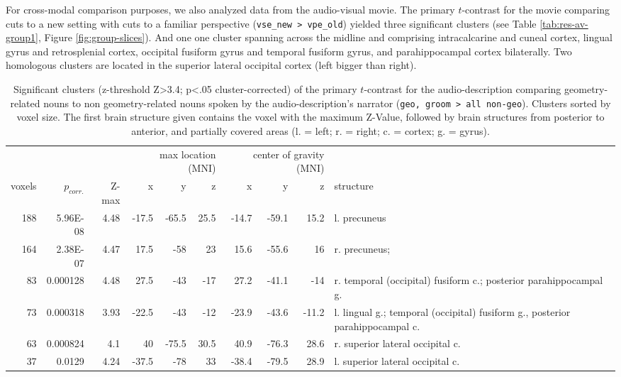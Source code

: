 \documentclass[english]{article}
\begin{document}
For cross-modal comparison purposes, we also analyzed data from the audio-visual
movie.
The primary $t$-contrast for the movie comparing cuts to a new setting with cuts
to a familiar perspective (\texttt{vse\_new > vpe\_old}) yielded three
significant clusters (see Table \ref{tab:res-av-group1}, Figure
\ref{fig:group-slices}).
And one one cluster spanning across the midline and comprising intracalcarine
and cuneal cortex, lingual gyrus and retrosplenial cortex, occipital fusiform
gyrus and temporal fusiform gyrus, and parahippocampal cortex bilaterally.
Two homologous clusters are located in the superior lateral occipital cortex
(left bigger than right).


\begin{table}[t]
    \caption{Significant clusters (z-threshold Z>3.4; p<.05 cluster-corrected)
        of the primary $t$-contrast for the audio-description comparing
        geometry-related nouns to non geometry-related nouns spoken by the
        audio-description's narrator (\texttt{geo, groom > all non-geo}).
        Clusters sorted by voxel size.
    The first brain structure given contains the voxel with the maximum Z-Value,
followed by brain structures from posterior to anterior, and partially covered
areas (l. = left; r. = right; c. = cortex; g. = gyrus).}
    \label{tab:res-ao-group1}
\begin{tabular}{rrrrrrrrrp{3cm}}
\toprule
& & & \multicolumn{3}{r}{max location (MNI)} & \multicolumn{3}{r}{center of gravity (MNI)} &
\\ \cmidrule{4-6} \cmidrule{7-9}
voxels & $p_{corr.}$ & Z-max & x & y & z  & x & y & z & structure \\
\midrule
188 & 5.96E-08 & 4.48 & -17.5 & -65.5 & 25.5 & -14.7 & -59.1 & 15.2 & l. precuneus \\
164 & 2.38E-07 & 4.47 & 17.5 & -58 & 23 & 15.6 & -55.6 & 16 & r. precuneus; \\
83 & 0.000128 & 4.48 & 27.5 & -43 & -17 & 27.2 & -41.1 & -14 & r. temporal (occipital) fusiform c.; posterior parahippocampal g. \\
73 & 0.000318 & 3.93 & -22.5 & -43 & -12 & -23.9 & -43.6 & -11.2 & l. lingual g.; temporal (occipital) fusiform g., posterior parahippocampal c. \\
63 & 0.000824 & 4.1 & 40 & -75.5 & 30.5 & 40.9 & -76.3 & 28.6 & r. superior lateral occipital c. \\
37 & 0.0129 & 4.24 & -37.5 & -78 & 33 & -38.4 & -79.5 & 28.9 & l. superior lateral occipital c. \\
\bottomrule
\end{tabular}
\end{table}
\end{document}
